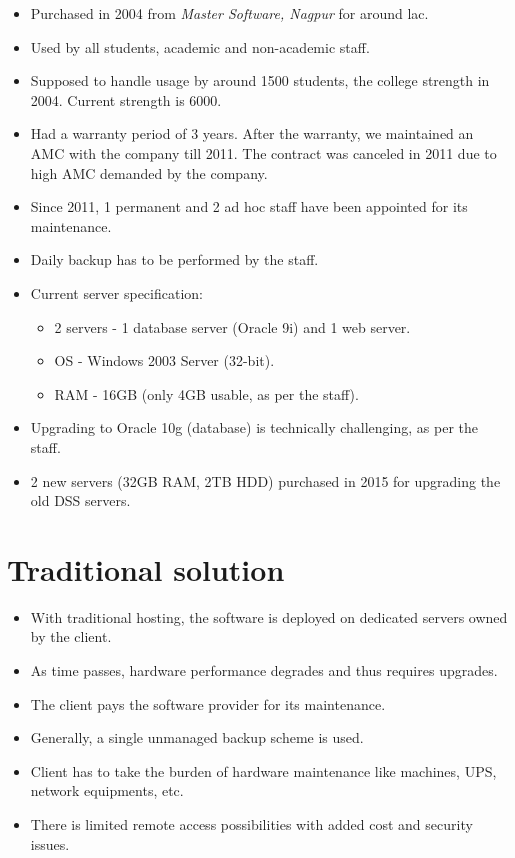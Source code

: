 \documentclass[12pt,a4paper,oneside]{article}
\begin{document}
\begin{itemize}
	\item Purchased in 2004 from \emph{Master Software, Nagpur} for around
		 lac.
	\item Used by all students, academic and non-academic staff.
	\item Supposed to handle usage by around 1500 students, the college
		strength in 2004. Current strength is 6000.
	\item Had a warranty period of 3 years. After the warranty, we
		maintained an AMC with the company till 2011. The contract was
		canceled in 2011 due to high AMC demanded by the company.
	\item Since 2011, 1 permanent and 2 ad hoc staff have been appointed for
		its maintenance.
	\item Daily backup has to be performed by the staff.
	\item Current server specification:
	\begin{itemize}
		\item 2 servers - 1 database server (Oracle 9i) and 1 web
			server.
		\item OS - Windows 2003 Server (32-bit).
		\item RAM - 16GB (only 4GB usable, as per the staff).
	\end{itemize}
	\item Upgrading to Oracle 10g (database) is technically challenging, as
		per the staff.
	\item 2 new servers (32GB RAM, 2TB HDD) purchased in 2015 for upgrading
		the old DSS servers.
\end{itemize}

\section{Traditional solution}
\begin{itemize}
	\item With traditional hosting, the software is deployed on dedicated
		servers owned by the client.
	\item As time passes, hardware performance degrades and thus requires
		upgrades.
	\item The client pays the software provider for its maintenance.
	\item Generally, a single unmanaged backup scheme is used.
	\item Client has to take the burden of hardware maintenance like
		machines, UPS, network equipments, etc.
	\item There is limited remote access possibilities with added cost and
		security issues.
\end{itemize}
\end{document}
